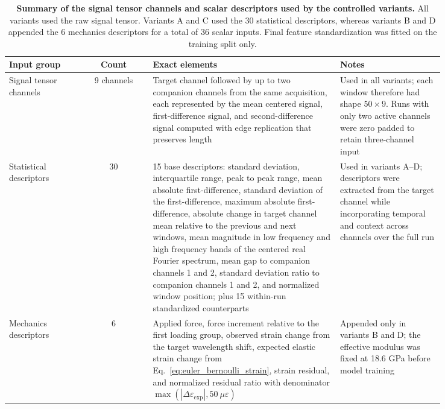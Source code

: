 \documentclass[fleqn,10pt]{wlscirep}
\begin{document}
\begin{table}[htbp]
\centering
\caption{\textbf{Summary of the signal tensor channels and scalar descriptors used by the controlled variants.} All variants used the raw signal tensor. Variants A and C used the 30 statistical descriptors, whereas variants B and D appended the 6 mechanics descriptors for a total of 36 scalar inputs. Final feature standardization was fitted on the training split only.}
\label{tab:input_summary}
\small
\begin{tabular}{p{0.17\linewidth}cp{0.43\linewidth}p{0.24\linewidth}}
\hline
Input group & Count & Exact elements & Notes \\
\hline
Signal tensor channels & 9 channels & Target channel followed by up to two companion channels from the same acquisition, each represented by the mean centered signal, first-difference signal, and second-difference signal computed with edge replication that preserves length & Used in all variants; each window therefore had shape $50\times9$. Runs with only two active channels were zero padded to retain three-channel input \\
Statistical descriptors & 30 & 15 base descriptors: standard deviation, interquartile range, peak to peak range, mean absolute first-difference, standard deviation of the first-difference, maximum absolute first-difference, absolute change in target channel mean relative to the previous and next windows, mean magnitude in low frequency and high frequency bands of the centered real Fourier spectrum, mean gap to companion channels 1 and 2, standard deviation ratio to companion channels 1 and 2, and normalized window position; plus 15 within-run standardized counterparts & Used in variants A--D; descriptors were extracted from the target channel while incorporating temporal and context across channels over the full run \\
Mechanics descriptors & 6 & Applied force, force increment relative to the first loading group, observed strain change from the target wavelength shift, expected elastic strain change from Eq.~\ref{eq:euler_bernoulli_strain}, strain residual, and normalized residual ratio with denominator $\max(|\Delta\varepsilon_{\mathrm{exp}}|, 50~\mu\varepsilon)$ & Appended only in variants B and D; the effective modulus was fixed at 18.6 GPa before model training \\
\hline
\end{tabular}
\end{table}

\FloatBarrier
\end{document}
